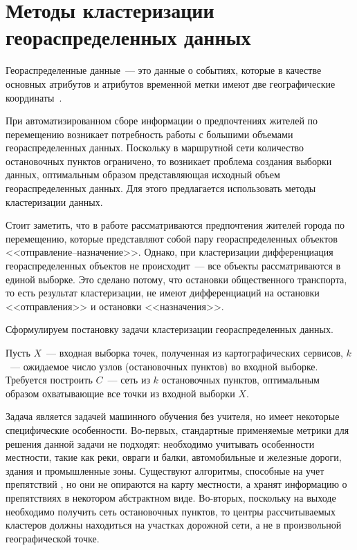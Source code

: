 \chapter{Методы кластеризации геораспределенных данных}
Геораспределенные данные~--- это данные о событиях, которые в качестве основных атрибутов и атрибутов временной метки имеют две географические координаты~\cite{RFFI}.

При автоматизированном сборе информации о предпочтениях жителей по перемещению возникает потребность работы с большими объемами геораспределенных данных. Поскольку в маршрутной сети количество остановочных пунктов ограничено, то возникает проблема создания выборки данных, оптимальным образом представляющая исходный объем геораспределенных данных. Для этого предлагается использовать методы кластеризации данных.

Стоит заметить, что в работе рассматриваются предпочтения жителей города по перемещению, которые представляют собой пару геораспределенных объектов <<отправление--назначение>>. Однако, при кластеризации дифференциация геораспределенных объектов не происходит~--- все объекты рассматриваются в единой выборке. Это сделано потому, что остановки общественного транспорта, то есть результат кластеризации, не имеют дифференциаций на остановки <<отправления>> и остановки <<назначения>>.

Сформулируем постановку задачи кластеризации геораспределенных данных.

Пусть \( X \)~--- входная выборка точек, полученная из картографических сервисов, \( k \)~--- ожидаемое число узлов (остановочных пунктов) во входной выборке. Требуется построить \( C \)~--- сеть из \( k \) остановочных пунктов, оптимальным образом охватывающие все точки из входной выборки \( X \).

Задача является задачей машинного обучения без учителя, но имеет некоторые специфические особенности. Во-первых, стандартные применяемые метрики для решения данной задачи не подходят: необходимо учитывать особенности местности, такие как реки, овраги и балки, автомобильные и железные дороги, здания и промышленные зоны. Существуют алгоритмы, способные на учет препятствий \cite{estivill, obstacles, cod}, но они не опираются на карту местности, а хранят информацию о препятствиях в некотором абстрактном виде. Во-вторых, поскольку на выходе необходимо получить сеть остановочных пунктов, то центры рассчитываемых кластеров должны находиться на участках дорожной сети, а не в произвольной географической точке.

